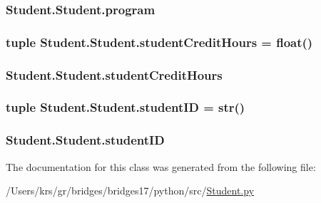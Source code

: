 \subsubsection[{program}]{\setlength{\rightskip}{0pt plus 5cm}Student.\+Student.\+program}\label{class_student_1_1_student_ac059f070275775de6e9f859d0927022e}
\hypertarget{class_student_1_1_student_a7500ff9d6e8b1e9795aadbf6b375ae59}{}
\subsubsection[{student\+Credit\+Hours}]{\setlength{\rightskip}{0pt plus 5cm}tuple Student.\+Student.\+student\+Credit\+Hours = float()\hspace{0.3cm}{\ttfamily [static]}}\label{class_student_1_1_student_a7500ff9d6e8b1e9795aadbf6b375ae59}
\hypertarget{class_student_1_1_student_ae2833e95922c2320ceade64dee9b66d0}{}
\subsubsection[{student\+Credit\+Hours}]{\setlength{\rightskip}{0pt plus 5cm}Student.\+Student.\+student\+Credit\+Hours}\label{class_student_1_1_student_ae2833e95922c2320ceade64dee9b66d0}
\hypertarget{class_student_1_1_student_ad0ff2ef29969f92c737112ff76e1eb23}{}
\subsubsection[{student\+I\+D}]{\setlength{\rightskip}{0pt plus 5cm}tuple Student.\+Student.\+student\+I\+D = str()\hspace{0.3cm}{\ttfamily [static]}}\label{class_student_1_1_student_ad0ff2ef29969f92c737112ff76e1eb23}
\hypertarget{class_student_1_1_student_ae09b19677b0b71c7977702f7f85266f1}{}
\subsubsection[{student\+I\+D}]{\setlength{\rightskip}{0pt plus 5cm}Student.\+Student.\+student\+I\+D}\label{class_student_1_1_student_ae09b19677b0b71c7977702f7f85266f1}


The documentation for this class was generated from the following file\+:\begin{DoxyCompactItemize}
\item 
/\+Users/krs/gr/bridges/bridges17/python/src/\hyperlink{_student_8py}{Student.\+py}\end{DoxyCompactItemize}
